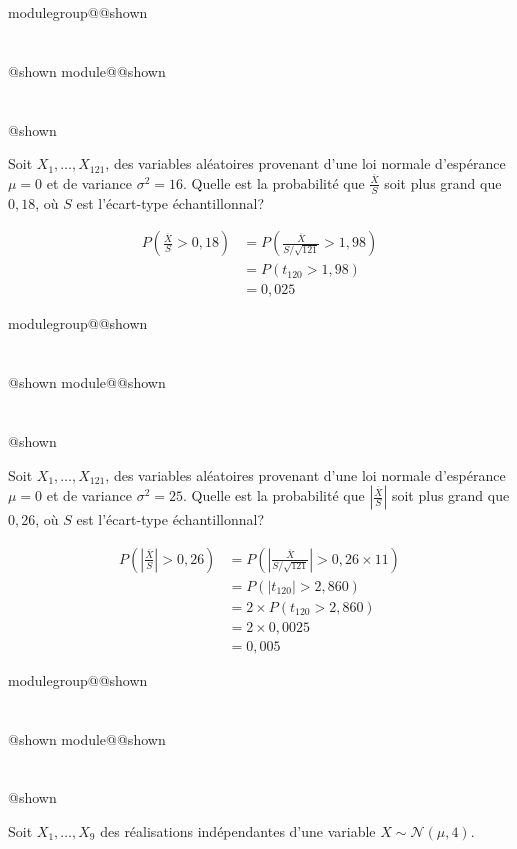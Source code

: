 \documentclass{Evaluation}
\makeatletter
\newcommand{\currentmodulekey}{}
\newcommand{\currentmoduletitle}{}
\newcommand{\currentgroupkey}{}
\newcommand{\currentgrouptitle}{}
\newcommand{\showmoduleifneeded}{%
  \ifx\currentgroupkey\empty\else
    \expandafter\ifx\csname modulegroup@\currentgroupkey @shown\endcsname\relax
      \section*{\currentgrouptitle}%
      \expandafter\gdef\csname modulegroup@\currentgroupkey @shown\endcsname{1}%
    \fi
  \fi
  \expandafter\ifx\csname module@\currentmodulekey @shown\endcsname\relax
    \section*{\currentmoduletitle}%
    \expandafter\gdef\csname module@\currentmodulekey @shown\endcsname{1}%
  \fi
}
\newenvironment{A24}{\showmoduleifneeded}{}
\newenvironment{H26}{\showmoduleifneeded}{}
\newenvironment{H26r}{\showmoduleifneeded}{}
\makeatother
\begin{document}
\begin{questions}
\begin{H26}
\question {} %
Soit $X_1,\hdots,X_{121}$, des variables aléatoires provenant d'une loi normale d'espérance $\mu=0$ et de variance $\sigma^2=16$. Quelle est la probabilité que $\displaystyle\frac{\overline{X}}{S}$ soit plus grand que $0,18$, où $S$ est l'écart-type échantillonnal?

    \begin{solution}
        \begin{align*}
            P\left(\frac{\overline{X}}{S}>0,18\right)&=P\left(\frac{\overline{X}}{S/\sqrt{121}}>1,98\right)\\
            &= P\left(t_{120}>1,98\right)\\
            &=0,025
        \end{align*}
    \end{solution}
\end{H26}

\begin{H26r}
\question {} %
Soit $X_1,\hdots,X_{121}$, des variables aléatoires provenant d'une loi normale d'espérance $\mu=0$ et de variance $\sigma^2=25$. Quelle est la probabilité que $\displaystyle\left|\frac{\overline{X}}{S}\right|$ soit plus grand que $0{,}26$, où $S$ est l'écart-type échantillonnal?

    \begin{solution}
        \begin{align*}
            P\left(\left|\frac{\overline{X}}{S}\right|>0{,}26\right)&=P\left(\left|\frac{\overline{X}}{S/\sqrt{121}}\right|>0{,}26\times 11\right)\\
            &= P\left(\left|t_{120}\right|>2,860\right)\\
            &= 2\times P\left(t_{120}>2,860\right)\\
            &=2\times 0{,}0025\\
            &=0{,}005
        \end{align*}
    \end{solution}
\end{H26r}

\begin{A24}
\question {} %
Soit $X_1,\hdots,X_9$ des réalisations indépendantes d'une variable $X\sim\mathcal{N}(\mu, 4)$.

\end{A24}
\end{questions}
\end{document}
